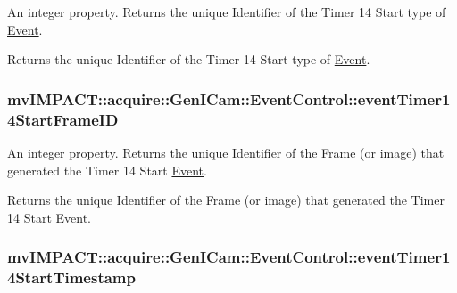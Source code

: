 An integer property. Returns the unique Identifier of the Timer 14 Start type of \hyperlink{classmv_i_m_p_a_c_t_1_1acquire_1_1_event}{Event}. 

Returns the unique Identifier of the Timer 14 Start type of \hyperlink{classmv_i_m_p_a_c_t_1_1acquire_1_1_event}{Event}. \hypertarget{classmv_i_m_p_a_c_t_1_1acquire_1_1_gen_i_cam_1_1_event_control_ac326d3d31139e94d4b2260f84fb7757a}{
\subsubsection[{event\+Timer14\+Start\+Frame\+I\+D}]{ mv\+I\+M\+P\+A\+C\+T\+::acquire\+::\+Gen\+I\+Cam\+::\+Event\+Control\+::event\+Timer14\+Start\+Frame\+I\+D}}\label{classmv_i_m_p_a_c_t_1_1acquire_1_1_gen_i_cam_1_1_event_control_ac326d3d31139e94d4b2260f84fb7757a}


An integer property. Returns the unique Identifier of the Frame (or image) that generated the Timer 14 Start \hyperlink{classmv_i_m_p_a_c_t_1_1acquire_1_1_event}{Event}. 

Returns the unique Identifier of the Frame (or image) that generated the Timer 14 Start \hyperlink{classmv_i_m_p_a_c_t_1_1acquire_1_1_event}{Event}. \hypertarget{classmv_i_m_p_a_c_t_1_1acquire_1_1_gen_i_cam_1_1_event_control_af223329a5896ceebd19546f852e5bc23}{
\subsubsection[{event\+Timer14\+Start\+Timestamp}]{ mv\+I\+M\+P\+A\+C\+T\+::acquire\+::\+Gen\+I\+Cam\+::\+Event\+Control\+::event\+Timer14\+Start\+Timestamp}}\label{classmv_i_m_p_a_c_t_1_1acquire_1_1_gen_i_cam_1_1_event_control_af223329a5896ceebd19546f852e5bc23}


